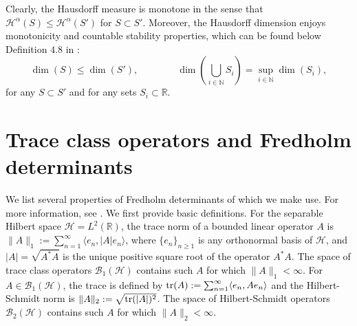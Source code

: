 \documentclass[oneside,final,11pt]{amsart}
\makeatletter
\newtheorem{lem}[thm]{Lemma}
\theoremstyle{definition}
\newcommand{\TV}{\mathrm{\scriptscriptstyle TV}}
\renewcommand{\d}{\mathrm{d}}
\newcommand*\bigcdot{\mathpalette\bigcdot@{.5}}
\newcommand*\bigcdot@[2]{\mathbin{\vcenter{\hbox{\scalebox{#2}{$\m@th#1\bullet$}}}}}
\newcommand{\R}{\mathbb{R}}
\newcommand{\nn}{\mathbb{N}}
\newcommand{\CH}{\mathcal{H}}
\newcommand{\CB}{\mathcal{B}}
\newcommand{\1}[1]{\mathbf{1}_{#1}}
\newcommand{\km}[1]{\marginnote{\tiny{\color{red}[KM: #1]}}}
\newcommand{\uptext}[1]{\text{\upshape{#1}}}
\DeclareMathOperator{\tr}{\mathop{\uptext{tr}}}
\numberwithin{equation}{section}
\makeatother
\begin{document}
Clearly, the Hausdorff measure is monotone in the sense that $\CH^\alpha(S) \leq \CH^\alpha(S')$ for $S \subset S'$. Moreover, the Hausdorff dimension enjoys monotonicity and countable stability properties, which can be found below Definition $4.8$ in \cite{Mattila}:
\begin{equation}\label{eq:monotone}
\dim(S) \leq \dim(S'), \qquad\qquad \dim \left( \bigcup_{i \in \nn} S_i \right) = \sup_{i \in \nn} \dim (S_i),
\end{equation}
for any $S \subset S'$ and for any sets $S_i \subset \R$.



\section{Trace class operators and Fredholm determinants}
\label{sec:Fredholm}

We list several properties of Fredholm determinants of which we make use. For more information, see \cite{Simon}.
We first provide basic definitions. For the separable Hilbert space $\CH = L^2(\R)$, the trace norm of a bounded linear operator $A$ is $\| A \|_1 := \sum_{n = 1}^\infty \langle e_n, |A| e_n \rangle$, where $\{e_n\}_{n \geq 1}$ is any orthonormal basis of $\CH$, and $|A| = \sqrt{A^* A}$ is the unique positive square root of the operator $A^* A$. The space of trace class operators $\CB_1(\CH)$ contains such $A$ for which $\| A \|_1 < \infty$. For $A \in \CB_1(\CH)$, the trace is defined by $\tr(A) := \sum_{n = 1}^\infty \langle e_n, A e_n \rangle$ and the Hilbert-Schmidt norm is $\| A \|_2 := \sqrt{\tr(|A|)^2}$. The space of Hilbert-Schmidt operators $\CB_2(\CH)$ contains such $A$ for which $\| A \|_2 < \infty$.
\end{document}
